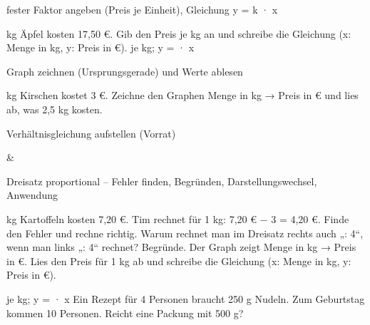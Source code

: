 \begin{aufgabe}{fester Faktor angeben (Preis je Einheit), Gleichung y = k · x}
\begin{teile}
 kg Äpfel kosten 17,50 €. Gib den Preis je kg an und schreibe die Gleichung (x: Menge in kg, y: Preis in €). \leerfeld[€] je kg; y = \leerfeld · x
\end{teile}
\end{aufgabe}

\begin{aufgabe}{Graph zeichnen (Ursprungsgerade) und Werte ablesen}
\begin{teile}
 kg Kirschen kostet 3 €. Zeichne den Graphen Menge in kg → Preis in € und lies ab, was 2,5 kg kosten.

\begin{ksys}[xmin=0,xmax=5,ymin=0,ymax=15,xlabel=Menge in kg,ylabel=Preis in €]\end{ksys}
\end{teile}
\end{aufgabe}

\begin{aufgabe}{Verhältnisgleichung aufstellen (Vorrat)}
\begin{gleichungsraster}[2]
 & \\
\end{gleichungsraster}
\end{aufgabe}

\begin{aufgabe}{Dreisatz proportional – Fehler finden, Begründen, Darstellungswechsel, Anwendung}
\begin{teile}
 kg Kartoffeln kosten 7,20 €. Tim rechnet für 1 kg: 7,20 € − 3 = 4,20 €. Finde den Fehler und rechne richtig.
\teil Warum rechnet man im Dreisatz rechts auch „: 4“, wenn man links „: 4“ rechnet? Begründe.
\teil Der Graph zeigt Menge in kg → Preis in €. Lies den Preis für 1 kg ab und schreibe die Gleichung (x: Menge in kg, y: Preis in €).

\begin{ksys}[xmin=0,xmax=4,ymin=0,ymax=6,ablesen,xlabel=Menge in kg,ylabel=Preis in €]\end{ksys}
\leerfeld[€] je kg; y = \leerfeld · x
\teil Ein Rezept für 4 Personen braucht 250 g Nudeln. Zum Geburtstag kommen 10 Personen. Reicht eine Packung mit 500 g?
\end{teile}
\end{aufgabe}
